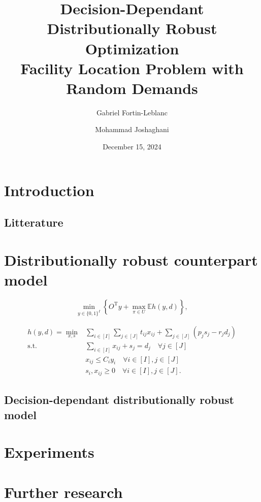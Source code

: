 \documentclass[12pt, letterpaper]{article}
\title{
	Decision-Dependant Distributionally Robust Optimization \\
	\large Facility Location Problem with Random Demands
}
\author[1]{Gabriel Fortin-Leblanc}
\author[2]{Mohammad Joshaghani}
\affil[1]{Université de Montréal}
\affil[2]{Université du Québec à Montréal}
\date{December 15, 2024}
\newcommand{\T}{\mathrm{T}}
\newcommand{\E}{\mathbb{E}}
\begin{document}
	\maketitle
	\tableofcontents
	\newpage
	
	\section*{Introduction}
	
	\subsection*{Litterature}
	
	\section{Distributionally robust counterpart model}
	\begin{equation}\label{eq:dro_outterproblem}
		\min_{y \in \{0, 1\}^I} \left\{O^\T y + \max_{\pi \in U} \E h(y, d)\right\},
	\end{equation}
	
	\begin{subequations}
		\begin{align} \label{eq:dro_innerproblem}
			h(y, d) = \min_{x, s} &\sum_{i \in [I]} \sum_{j \in [J]} t_{ij}x_{ij} + \sum_{j \in [J]} (p_j s_j - r_j d_j) \\
			\text{s.t.} &\sum_{i \in [I]} x_{ij} + s_j = d_j \quad \forall j \in [J] \\
			&x_{ij} \le C_i y_i \quad \forall i \in [I], j \in [J] \\
			&s_i, x_{ij} \ge 0 \quad \forall i \in [I], j \in [J].
		\end{align}
	\end{subequations}
	
	\subsection{Decision-dependant distributionally robust model}
	
	\section{Experiments}
	
	\section{Further research}
	
	
	
\end{document}
